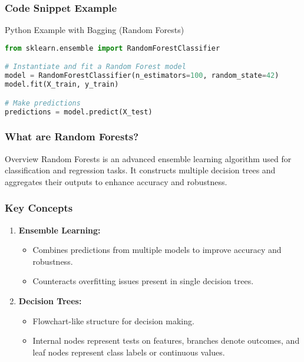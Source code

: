 \documentclass{beamer}
\begin{document}
\begin{frame}[fragile]
    \frametitle{Code Snippet Example}
    \begin{block}{Python Example with Bagging (Random Forests)}
        \begin{lstlisting}[language=Python]
from sklearn.ensemble import RandomForestClassifier

# Instantiate and fit a Random Forest model
model = RandomForestClassifier(n_estimators=100, random_state=42)
model.fit(X_train, y_train)

# Make predictions
predictions = model.predict(X_test)
        \end{lstlisting}
    \end{block}
\end{frame}

\begin{frame}[fragile]
    \frametitle{What are Random Forests?}
    \begin{block}{Overview}
        Random Forests is an advanced ensemble learning algorithm used for classification and regression tasks. 
        It constructs multiple decision trees and aggregates their outputs to enhance accuracy and robustness.
    \end{block}
\end{frame}

\begin{frame}[fragile]
    \frametitle{Key Concepts}
    \begin{enumerate}
        \item \textbf{Ensemble Learning:}
            \begin{itemize}
                \item Combines predictions from multiple models to improve accuracy and robustness.
                \item Counteracts overfitting issues present in single decision trees.
            \end{itemize}
        \item \textbf{Decision Trees:}
            \begin{itemize}
                \item Flowchart-like structure for decision making.
                \item Internal nodes represent tests on features, branches denote outcomes, and leaf nodes represent class labels or continuous values.
            \end{itemize}
    \end{enumerate}
\end{frame}
\end{document}
